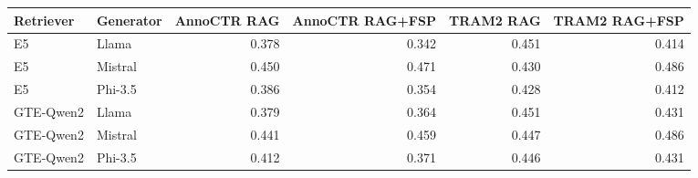 \begin{tabular}{llrrrr}
\toprule
Retriever & Generator & AnnoCTR RAG & AnnoCTR RAG+FSP & TRAM2 RAG & TRAM2 RAG+FSP \\
\midrule
E5 & Llama & 0.378 & 0.342 & 0.451 & 0.414 \\
E5 & Mistral & 0.450 & 0.471 & 0.430 & 0.486 \\
E5 & Phi-3.5 & 0.386 & 0.354 & 0.428 & 0.412 \\
GTE-Qwen2 & Llama & 0.379 & 0.364 & 0.451 & 0.431 \\
GTE-Qwen2 & Mistral & 0.441 & 0.459 & 0.447 & 0.486 \\
GTE-Qwen2 & Phi-3.5 & 0.412 & 0.371 & 0.446 & 0.431 \\
\bottomrule
\end{tabular}